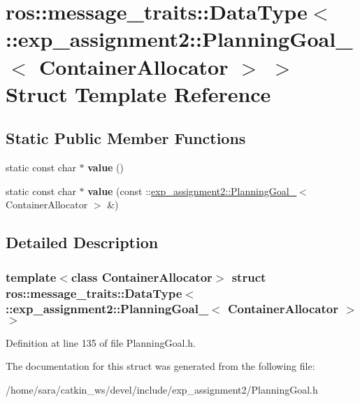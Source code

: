 \hypertarget{structros_1_1message__traits_1_1DataType_3_01_1_1exp__assignment2_1_1PlanningGoal___3_01ContainerAllocator_01_4_01_4}{}\section{ros\+:\+:message\+\_\+traits\+:\+:Data\+Type$<$ \+:\+:exp\+\_\+assignment2\+:\+:Planning\+Goal\+\_\+$<$ Container\+Allocator $>$ $>$ Struct Template Reference}
\label{structros_1_1message__traits_1_1DataType_3_01_1_1exp__assignment2_1_1PlanningGoal___3_01ContainerAllocator_01_4_01_4}
\subsection*{Static Public Member Functions}
\begin{DoxyCompactItemize}
\item 
\mbox{\label{structros_1_1message__traits_1_1DataType_3_01_1_1exp__assignment2_1_1PlanningGoal___3_01ContainerAllocator_01_4_01_4_a26c3b8e958318657de40dad6fd63c338}} 
static const char $\ast$ {\bfseries value} ()
\item 
\mbox{\label{structros_1_1message__traits_1_1DataType_3_01_1_1exp__assignment2_1_1PlanningGoal___3_01ContainerAllocator_01_4_01_4_a4f5e2c13d6964dec2feaa49e02296be0}} 
static const char $\ast$ {\bfseries value} (const \+::\hyperlink{structexp__assignment2_1_1PlanningGoal__}{exp\+\_\+assignment2\+::\+Planning\+Goal\+\_\+}$<$ Container\+Allocator $>$ \&)
\end{DoxyCompactItemize}


\subsection{Detailed Description}
\subsubsection*{template$<$class Container\+Allocator$>$\newline
struct ros\+::message\+\_\+traits\+::\+Data\+Type$<$ \+::exp\+\_\+assignment2\+::\+Planning\+Goal\+\_\+$<$ Container\+Allocator $>$ $>$}



Definition at line 135 of file Planning\+Goal.\+h.



The documentation for this struct was generated from the following file\+:\begin{DoxyCompactItemize}
\item 
/home/sara/catkin\+\_\+ws/devel/include/exp\+\_\+assignment2/Planning\+Goal.\+h\end{DoxyCompactItemize}
